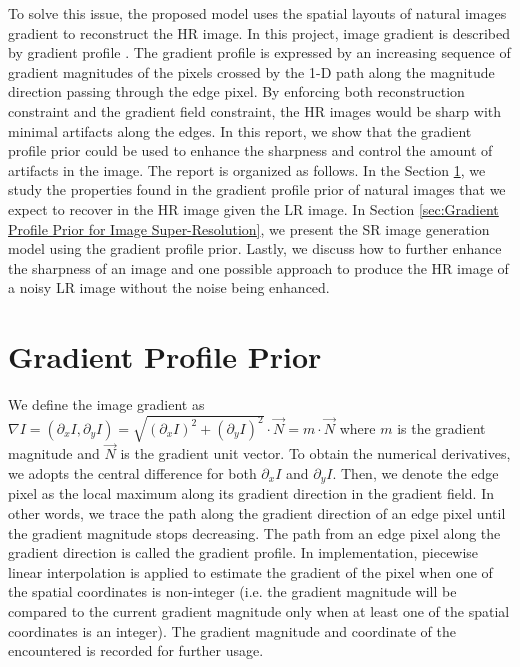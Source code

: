 \documentclass[a4paper,11pt]{article}
\begin{document}
To solve this issue, the proposed model uses the spatial layouts of natural images gradient to reconstruct the HR image. In this project, image gradient is described by gradient profile \cite{sr11}. The gradient profile is expressed by an increasing sequence of gradient magnitudes of the pixels crossed by the 1-D path along the magnitude direction passing through the edge pixel. By enforcing both reconstruction constraint and the gradient field constraint, the HR images would be sharp with minimal artifacts along the edges. In this report, we show that the gradient profile prior could be used to enhance the sharpness and control the amount of artifacts in the image. The report is organized as follows. In the Section \ref{sec:Gradient Profile Prior}, we study the properties found in the gradient profile prior of natural images that we expect to recover in the HR image given the LR image. In Section \ref{sec:Gradient Profile Prior for Image Super-Resolution}, we present the SR image generation model using the gradient profile prior. Lastly, we discuss how to further enhance the sharpness of an image and one possible approach to produce the HR image of a noisy LR image without the noise being enhanced.

\section{Gradient Profile Prior}
\label{sec:Gradient Profile Prior}

We define the image gradient as $\nabla I = (\partial_x I, \partial_y I) = \sqrt{(\partial_x I)^2 + (\partial_y I)^2} \cdot \vec{N} = m \cdot \vec{N} $ where $m$ is the gradient magnitude and $\vec{N}$ is the gradient unit vector. To obtain the numerical derivatives, we adopts the central difference for both $\partial_x I$ and $\partial_y I$. Then, we denote the edge pixel as the local maximum along its gradient direction in the gradient field. In other words, we trace the path along the gradient direction of an edge pixel until the gradient magnitude stops decreasing. The path from an edge pixel along the gradient direction is called the gradient profile. In implementation, piecewise linear interpolation is applied to estimate the gradient of the pixel when one of the spatial coordinates is non-integer (i.e. the gradient magnitude will be compared to the current gradient magnitude only when at least one of the spatial coordinates is an integer). The gradient magnitude and coordinate of the encountered is recorded for further usage.
\end{document}
